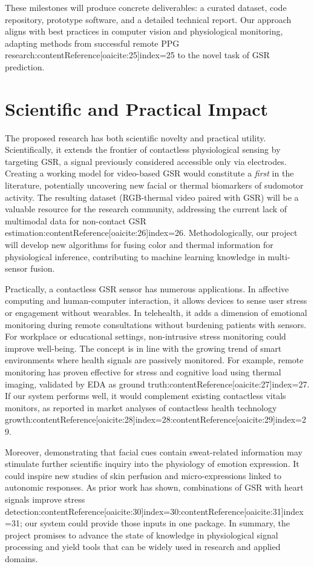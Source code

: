 \documentclass[12pt]{article}
\begin{document}
    These milestones will produce concrete deliverables: a curated dataset, code repository, prototype software, and a detailed technical report. Our approach aligns with best practices in computer vision and physiological monitoring, adapting methods from successful remote PPG research:contentReference[oaicite:25]{index=25} to the novel task of GSR prediction.


    \section{Scientific and Practical Impact}
    The proposed research has both scientific novelty and practical utility. Scientifically, it extends the frontier of contactless physiological sensing by targeting GSR, a signal previously considered accessible only via electrodes. Creating a working model for video-based GSR would constitute a \emph{first} in the literature, potentially uncovering new facial or thermal biomarkers of sudomotor activity. The resulting dataset (RGB-thermal video paired with GSR) will be a valuable resource for the research community, addressing the current lack of multimodal data for non-contact GSR estimation:contentReference[oaicite:26]{index=26}. Methodologically, our project will develop new algorithms for fusing color and thermal information for physiological inference, contributing to machine learning knowledge in multi-sensor fusion.

    Practically, a contactless GSR sensor has numerous applications. In affective computing and human-computer interaction, it allows devices to sense user stress or engagement without wearables. In telehealth, it adds a dimension of emotional monitoring during remote consultations without burdening patients with sensors. For workplace or educational settings, non-intrusive stress monitoring could improve well-being. The concept is in line with the growing trend of smart environments where health signals are passively monitored. For example, remote monitoring has proven effective for stress and cognitive load using thermal imaging, validated by EDA as ground truth:contentReference[oaicite:27]{index=27}. If our system performs well, it would complement existing contactless vitals monitors, as reported in market analyses of contactless health technology growth:contentReference[oaicite:28]{index=28}:contentReference[oaicite:29]{index=29}.

    Moreover, demonstrating that facial cues contain sweat-related information may stimulate further scientific inquiry into the physiology of emotion expression. It could inspire new studies of skin perfusion and micro-expressions linked to autonomic responses. As prior work has shown, combinations of GSR with heart signals improve stress detection:contentReference[oaicite:30]{index=30}:contentReference[oaicite:31]{index=31}; our system could provide those inputs in one package. In summary, the project promises to advance the state of knowledge in physiological signal processing and yield tools that can be widely used in research and applied domains.
\end{document}
